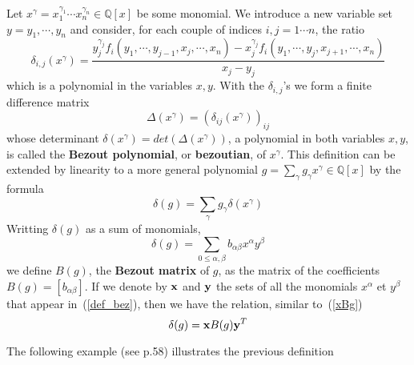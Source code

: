 \documentclass{standalone}
\begin{document}
\begin{defn}
Let $x^\gamma = x_1^{\gamma_1}\cdots x_n^{\gamma_n} \in \mathbb{Q}[x]$ be some monomial.
We introduce a new variable set $y = y_1,\cdots, y_n$ and consider, for each couple of indices $i, j = 1\cdots n$, the ratio
\begin{equation}
\label{finite_diff}
\delta_{i,j}(x^\gamma) = \dfrac{y_j^{\gamma_j}f_i(y_1,\cdots, y_{j-1},x_j,\cdots,x_n) - x_j^{\gamma_j}f_i(y_1,\cdots,y_j,x_{j+1},\cdots,x_n)}{x_j - y_j}
\end{equation}
which is a polynomial in the variables $x, y$. 
With the $\delta_{i,j}$'s we form a finite difference matrix
\begin{equation}
\label{Delta}
\Delta(x^\gamma) = (\delta_{ij}(x^\gamma))_{ij}
\end{equation}
whose determinant $\delta(x^\gamma) = det(\Delta(x^\gamma))$, a polynomial in both variables $x, y$, is called the {\bf Bezout polynomial}, or {\bf bezoutian}, of $x^\gamma$.
This definition can be extended by linearity to a more general polynomial $g = \sum_\gamma g_\gamma x^\gamma \in \mathbb{Q}[x]$ by the formula
$$\delta(g) = \sum_\gamma g_\gamma \delta(x^\gamma)$$
Writting $\delta(g)$ as a sum of monomials, 
\begin{equation}
\label{def_bez}
\delta(g) = \sum_{0 \le \alpha,\beta} b_{\alpha\beta} x^\alpha y^\beta
\end{equation} 
we define $B(g)$, the {\bf Bezout matrix} of $g$, as the matrix of the coefficients $B(g) = [b_{\alpha\beta}]$. If we denote by $\bold{x}$ and $\bold{y}$ the sets of all the monomials $x^\alpha$ et $y^\beta$ that appear in~(\ref{def_bez}), then we have the relation, similar to~(\ref{xBg})
\begin{equation}
	\delta(g) = \bold{x} B(g) \bold{y}^T
\end{equation}
\end{defn}
The following example (see \cite{jpc} p.58) illustrates the previous definition
\end{document}
